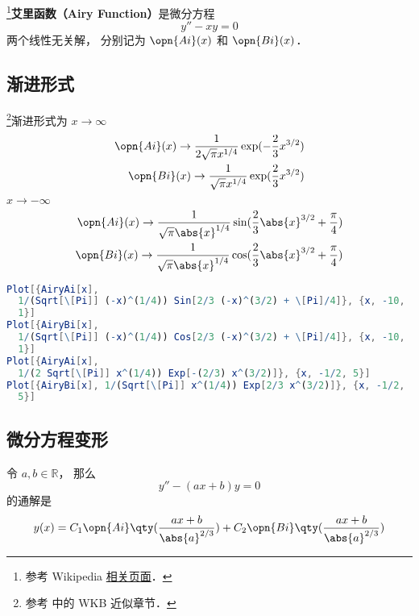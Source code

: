 
\begin{issues}
\issueDraft
\end{issues}

\footnote{参考 Wikipedia \href{https://en.wikipedia.org/wiki/Airy_function}{相关页面}．}\textbf{艾里函数（Airy Function）}是微分方程
\begin{equation}
y'' - xy = 0
\end{equation}
两个线性无关解， 分别记为 $\opn{Ai}(x)$ 和 $\opn{Bi}(x)$．

\subsection{渐进形式}
\footnote{参考 \cite{GriffQ} 中的 WKB 近似章节．}渐进形式为 $x \to \infty$
\begin{align}
\opn{Ai}(x) \to \frac{1}{2\sqrt{\pi} x^{1/4}} \exp(-\frac{2}{3}x^{3/2})\\
\opn{Bi}(x) \to \frac{1}{\sqrt{\pi} x^{1/4}} \exp(\frac{2}{3}x^{3/2})
\end{align}
$x \to -\infty$
\begin{align}
\opn{Ai}(x) \to \frac{1}{\sqrt{\pi} \abs{x}^{1/4}} \sin(\frac{2}{3}\abs{x}^{3/2}+\frac{\pi}{4})\\
\opn{Bi}(x) \to \frac{1}{\sqrt{\pi} \abs{x}^{1/4}} \cos(\frac{2}{3}\abs{x}^{3/2}+\frac{\pi}{4})
\end{align}

\begin{lstlisting}[language=Mathematica]
Plot[{AiryAi[x], 
  1/(Sqrt[\[Pi]] (-x)^(1/4)) Sin[2/3 (-x)^(3/2) + \[Pi]/4]}, {x, -10, 
  1}]
Plot[{AiryBi[x], 
  1/(Sqrt[\[Pi]] (-x)^(1/4)) Cos[2/3 (-x)^(3/2) + \[Pi]/4]}, {x, -10, 
  1}]
Plot[{AiryAi[x], 
  1/(2 Sqrt[\[Pi]] x^(1/4)) Exp[-(2/3) x^(3/2)]}, {x, -1/2, 5}]
Plot[{AiryBi[x], 1/(Sqrt[\[Pi]] x^(1/4)) Exp[2/3 x^(3/2)]}, {x, -1/2, 
  5}]
\end{lstlisting}

\subsection{微分方程变形}
令 $a, b\in \mathbb R$， 那么
\begin{equation}
y'' - (ax + b) y = 0
\end{equation}
的通解是
\begin{equation}\label{AiryF_eq1}
y(x) = C_1\opn{Ai}\qty(\frac{ax+b}{\abs{a}^{2/3}}) + C_2 \opn{Bi}\qty(\frac{ax+b}{\abs{a}^{2/3}})
\end{equation}
